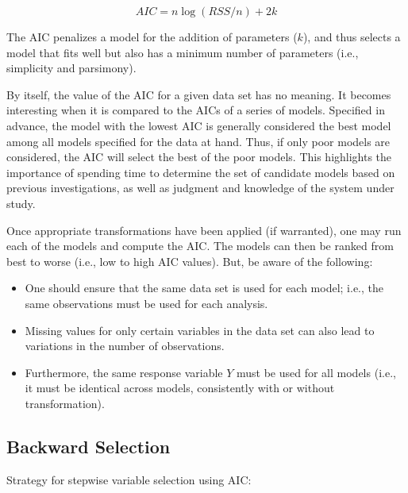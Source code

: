 \documentclass[
]{book}
\providecommand{\tightlist}{%
  \setlength{\itemsep}{0pt}\setlength{\parskip}{0pt}}
\begin{document}
\[AIC = n\log\left({RSS}/{n}\right) + 2k\]

The AIC penalizes a model for the addition of parameters (\(k\)), and thus selects a model that fits well but also has a minimum number of parameters (i.e., simplicity and parsimony).

By itself, the value of the AIC for a given data set has no meaning. It becomes interesting when it is compared to the AICs of a series of models. Specified in advance, the model with the lowest AIC is generally considered the best model among all models specified for the data at hand. Thus, if only poor models are considered, the AIC will select the best of the poor models. This highlights the importance of spending time to determine the set of candidate models based on previous investigations, as well as judgment and knowledge of the system under study.

Once appropriate transformations have been applied (if warranted), one may run each of the models and compute the AIC. The models can then be ranked from best to worse (i.e., low to high AIC values). But, be aware of the following:

\begin{itemize}
\tightlist
\item
  One should ensure that the same data set is used for each model; i.e., the same observations must be used for each analysis.
\item
  Missing values for only certain variables in the data set can also lead to variations in the number of observations.
\item
  Furthermore, the same response variable \(Y\) must be used for all models (i.e., it must be identical across models, consistently with or without transformation).
\end{itemize}

\hypertarget{backward-selection}{%
\subsection{Backward Selection}\label{backward-selection}}

Strategy for stepwise variable selection using AIC:
\end{document}
